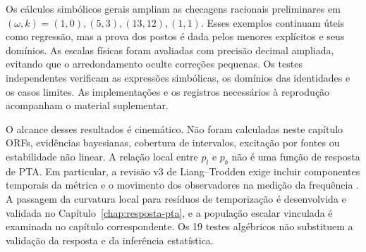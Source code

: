 Os cálculos simbólicos gerais ampliam as checagens racionais
preliminares em \((\omega,k)=(1,0),(5,3),(13,12),(1,1)\). Esses
exemplos continuam úteis como regressão, mas a prova dos postos é dada
pelos menores explícitos e seus domínios. As escalas físicas foram
avaliadas com precisão decimal ampliada, evitando que o arredondamento
oculte correções pequenas. Os testes independentes verificam as expressões simbólicas, os domínios das identidades e os casos limites. As implementações e os registros necessários à reprodução acompanham o material suplementar.

O alcance desses resultados é cinemático. Não foram calculadas neste
capítulo ORFs, evidências bayesianas, cobertura de intervalos, excitação
por fontes ou estabilidade não linear. A relação local entre
\(p_l\) e \(p_b\) não é uma função de resposta de PTA. Em
particular, a revisão v3 de Liang--Trodden exige incluir componentes
temporais da métrica e o movimento dos observadores na medição da
frequência \autocite{liang2021}. A passagem da curvatura local para
resíduos de temporização é desenvolvida e validada no Capítulo~\ref{chap:resposta-pta}, e a
população escalar vinculada é examinada no capítulo correspondente. Os 19 testes algébricos não substituem a validação da resposta e da inferência estatística.
